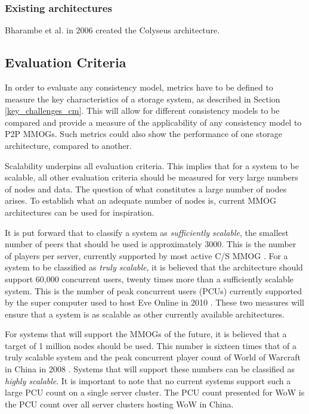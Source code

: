 \documentclass[10pt,a4paper,journal,cspaper,compsoc]{IEEEtran}
\begin{document}
\subsubsection{Existing architectures}

Bharambe et al. in 2006 created the Colyseus architecture.



\subsection{Evaluation Criteria} \label{eval_crit}

In order to evaluate any consistency model, metrics have to be defined to measure the key characteristics of a storage system, as described in
Section \ref{key_challenges_cm}. This will allow for different consistency models to be compared and provide a measure of the applicability of any
consistency model to P2P MMOGs. Such metrics could also show the performance of one storage architecture, compared to another.

Scalability underpins all evaluation criteria. This implies that for a system to be scalable, all other evaluation criteria should be measured for
very large numbers of nodes and data. The question of what constitutes a large number of nodes arises. To establish what an adequate number of nodes
is, current MMOG architectures can be used for inspiration.

It is put forward that to classify a system as \emph{sufficiently scalable}, the smallest number of peers that should be used is approximately 3000.
This is the number of players per server, currently supported by most active C/S MMOG \cite{}. For a system to be classified as \emph{truly
scalable}, it is believed that the architecture should support 60,000 concurrent users, twenty times more than a sufficiently scalable system. This
is the number of peak concurrent users (PCUs) currently supported by the super computer used to host Eve Online in 2010 \cite{eve_pcu}. These two
measures will ensure that a system is as scalable as other currently available architectures.

For systems that will support the MMOGs of the future, it is believed that a target of 1 million nodes should be used. This number is sixteen times
that of a truly scalable system and the peak concurrent player count of World of Warcraft in China in 2008 \cite{WoW_china_pcu}. Systems that will
support these numbers can be classified as \emph{highly scalable}. It is important to note that no current systems support such a large PCU count on
a single server cluster. The PCU count presented for WoW is the PCU count over all server clusters hosting WoW in China.
\end{document}
